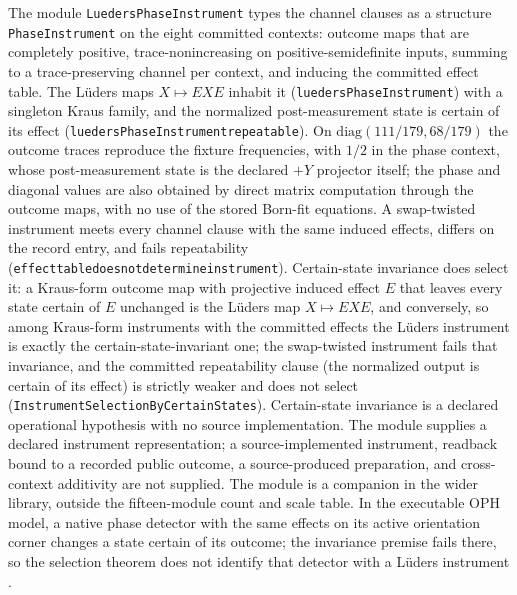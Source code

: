 \documentclass[11pt]{article}
\renewcommand{\_}{\textunderscore\allowbreak}
\theoremstyle{remark}
\begin{document}
The module \texttt{LuedersPhaseInstrument} types the channel clauses as a
structure \texttt{PhaseInstrument} on the eight committed contexts: outcome maps
that are completely positive, trace-nonincreasing on positive-semidefinite
inputs, summing to a trace-preserving channel per context, and inducing the
committed effect table. The L\"uders maps $X \mapsto EXE$ inhabit it
(\texttt{luedersPhaseInstrument}) with a singleton Kraus family, and the
normalized post-measurement state is certain of its effect
(\texttt{luedersPhaseInstrument\_repeatable}). On $\mathrm{diag}(111/179, 68/179)$
the outcome traces reproduce the fixture frequencies, with $1/2$ in the phase
context, whose post-measurement state is the declared $+Y$ projector itself;
the phase and diagonal values are also obtained by direct matrix computation
through the outcome maps, with no use of the stored Born-fit equations. A
swap-twisted instrument meets every channel clause with the same induced effects,
differs on the record entry, and fails repeatability
(\texttt{effect\_table\_does\_not\_determine\_instrument}). Certain-state
invariance does select it: a Kraus-form outcome map with projective induced
effect $E$ that leaves every state certain of $E$ unchanged is the L\"uders
map $X \mapsto EXE$, and conversely, so among Kraus-form instruments with the
committed effects the L\"uders instrument is exactly the certain-state-invariant
one; the swap-twisted instrument fails that invariance, and the committed
repeatability clause (the normalized output is certain of its effect) is
strictly weaker and does not select
(\texttt{InstrumentSelectionByCertainStates}). Certain-state invariance is a
declared operational hypothesis with no source implementation. The module
supplies a declared instrument representation; a source-implemented
instrument, readback bound to a recorded public outcome, a source-produced
preparation, and cross-context additivity are not supplied. The module is a
companion in the wider library, outside the fifteen-module count and scale
table. In the executable OPH model, a native phase detector with the same
effects on its active orientation corner changes a state certain of its
outcome; the invariance premise fails there, so the selection theorem does
not identify that detector with a L\"uders instrument \cite{ophnativeinterface}.
\end{document}
